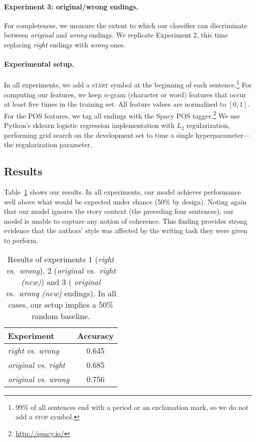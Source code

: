 \documentclass[11pt,a4paper]{article}
\newcommand{\tabref}[1]{Table~\ref{#1}}
\newcommand{\isubsectionb}[1]{\subsection{#1}\label{ssec:#1}}
\begin{document}
\paragraph{Experiment 3: original/wrong endings.}
For completeness, we measure the extent to which our classifier can discriminate between {\it original} and {\it wrong} endings. We replicate Experiment 2, this time replacing {\it right} endings with {\it wrong} ones.


\paragraph{Experimental setup.}
In all experiments, we add a \textsc{start} symbol at the beginning
of each sentence.\footnote{99\% of all sentences end with a period
  or an exclamation mark, so we do not add a \textsc{stop} symbol.}
For computing our features, we keep $n$-gram (character or word) features that occur at least five times in the training set.
All feature values are normalized to $[0, 1]$.
For the POS features, we tag all endings with the Spacy POS tagger.\footnote{\url{http://spacy.io/}}
We use  Python's sklearn logistic regression implementation \cite{scikit-learn} with $L_2$
regularization, performing grid search on the development set to
tune a single hyperparameter---the regularization parameter.


\isubsectionb{Results}
\tabref{results} shows our results.  In all experiments,
our model achieves performance well above what would be expected under
chance (50\% by design).  Noting again that our model ignores the
story context (the preceding four sentences), our model is unable to
capture any notion of coherence.   This finding provides
strong evidence that the authors' style was affected by the writing task they
were given to perform.



\begin{table}[!t]
\begin{center}
\begin{tabular}{|l|c|} \hline
{\bf Experiment} & {\bf Accuracy} \\ \hline
{\sl right vs. wrong} & 0.645 \\ \hline
{\sl original vs. right} & 0.685 \\ \hline
{\sl original vs. wrong} & 0.756 \\ \hline
\end{tabular}
\end{center}
\caption{\label{results}Results of  experiments 1 ({\it right vs.~wrong}), 2 ({\it original vs.~right (new)}) and 3 ({\it
  original vs.~wrong (new)} endings).
In all cases, our setup implies a 50\% random baseline.}
\end{table}
\end{document}
